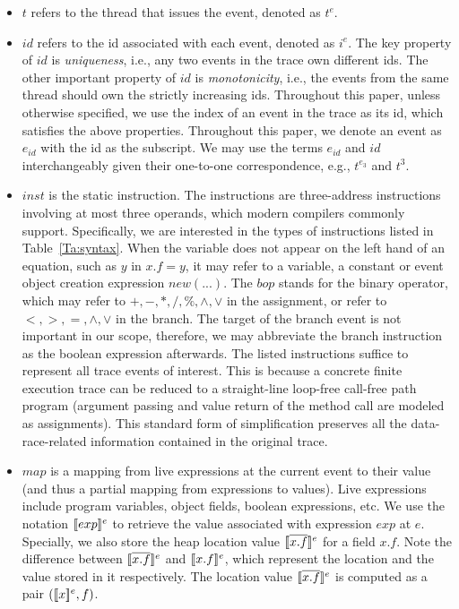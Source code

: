 \begin{itemize}
\item $t$ refers to the thread that issues the event, denoted as $t^e$.
\item  $id$ refers to the id associated with each event, denoted as $i^e$. The key property of  $id$ is {\em uniqueness}, i.e., any two events in the trace own different ids. The other important property of $id$ is {\em monotonicity}, i.e.,  the events from the same thread should own the strictly increasing ids. Throughout this paper, unless otherwise specified, we use  the index of an event in the trace as its id, which satisfies the above properties. Throughout this paper,  we denote an event as $e_{id}$ with the id as the subscript. We may use the terms $e_{id}$ and $id$ interchangeably given their one-to-one correspondence, e.g., $t^{e_3}$ and $t^3$. 
\item $inst$ is the static instruction. The instructions are three-address instructions involving at most three operands, which modern compilers commonly support.  Specifically, we are interested in the types of instructions listed in Table~\ref{Ta:syntax}. When the variable does not appear on the left hand of an equation, such as $y$ in $x.f=y$, it may refer to a variable, a constant or event object creation expression $new (...)$.  The $bop$ stands for the binary operator, which may refer to $+, -, *, /, \%, \wedge, \vee$ in the assignment, or refer to $<, >, =, \wedge, \vee$ in the branch. The target of the branch event is not important in our scope, therefore, we may abbreviate the branch instruction as the boolean expression afterwards. The listed instructions suffice to represent all trace events of interest. This is because a concrete finite execution trace can be reduced to a straight-line loop-free call-free path program  (argument passing and value return of the method call are modeled as assignments). This standard form of simplification preserves all the data-race-related information contained in the original trace. 
\item $map$ is a mapping from live expressions at the current event to their value (and thus a partial mapping from expressions to values). Live expressions include program variables, object fields, boolean expressions, etc. We use the notation $\lbrack\!\lbrack exp \rbrack\!\rbrack^e$ to retrieve the value associated with expression $exp$ at $e$.
Specially,  we also store the heap location value  $\lbrack\!\lbrack \overline{x.f} \rbrack\!\rbrack^e$ for a field $x.f$. Note the difference between $\lbrack\!\lbrack \overline{x.f} \rbrack\!\rbrack^e$ and $\lbrack\!\lbrack x.f \rbrack\!\rbrack^e$, which represent the location and the value stored in it respectively. The location value $\lbrack\!\lbrack \overline{x.f} \rbrack\!\rbrack^e$ is computed as a pair $(\lbrack\!\lbrack x \rbrack\!\rbrack^e, f)$.
\end{itemize}

